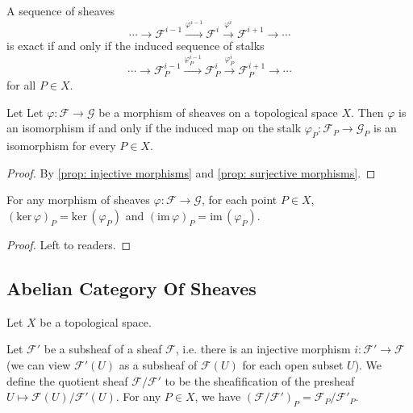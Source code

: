 \documentclass[11pt]{article}
\begin{document}
\begin{corollary}
    \cite[Exercise II.1.2]{hartsAG} 
    A sequence of sheaves 
    $$ \cdots \to \mathscr{F}^{i-1} \xrightarrow{\varphi^{i-1}} \mathscr{F}^{i} \xrightarrow{\varphi^{i}}\mathscr{F}^{i+1} \to \cdots $$ 
    is exact if and only if the induced sequence of stalks 
    $$ \cdots \to \mathscr{F}^{i-1}_{P} \xrightarrow{\varphi^{i-1}_{P}} \mathscr{F}^{i}_{P} \xrightarrow{\varphi^{i}_{P}}\mathscr{F}^{i+1}_{P} \to \cdots $$ 
    for all $ P \in X $.  
\end{corollary}

\begin{proposition}
    \label{prop: isomorphism of sheaves}
    \cite[Proposition II.1.1]{hartsAG} 
    Let Let $\varphi: \mathscr{F} \to \mathscr{G}$ be a morphism of sheaves on a topological space $X$. 
    Then $\varphi$ is an isomorphism if and only if the 
    induced map on the stalk $\varphi_{P}: \mathscr{F}_{P} \to \mathscr{G}_{P}$ is 
    an isomorphism for every $P \in X$. 
\end{proposition}

\begin{proof}
    By \autoref{prop: injective morphisms} and \autoref{prop: surjective morphisms}. 
\end{proof}

\begin{proposition}
    \cite[Exercise II.1.2]{hartsAG} 
    For any morphism of sheaves $\varphi:\mathscr{F} \to \mathscr{G}$, 
    for each point $P \in X$, $(\mathrm{ker}\,\varphi)_{P}=\mathrm{ker}\,(\varphi_{P})$ 
    and $(\mathrm{im}\,\varphi)_{P}=\mathrm{im}\,(\varphi_{P})$. 
\end{proposition}

\begin{proof}
    Left to readers. 
\end{proof}


\subsection{Abelian Category Of Sheaves}

Let $ X $ be a topological space. 

\begin{definition}
  Let $\mathscr{F}'$ be a subsheaf of a sheaf $\mathscr{F}$, 
  i.e. there is an injective morphism $ i:\mathscr{F}' \to \mathscr{F} $ 
  (we can view $ \mathscr{F}'(U) $ as a subsheaf of $ \mathscr{F}(U) $ for each open subset $ U $). 
  We define the quotient sheaf $\mathscr{F} / \mathscr{F}'$ to be the sheafification 
  of the presheaf $U \mapsto \mathscr{F}(U) / \mathscr{F}'(U)$. 
  For any $ P \in X $, we have $ (\mathscr{F} / \mathscr{F}')_{P} = \mathscr{F}_{P} / \mathscr{F}'_{P} $. 
\end{definition}
\end{document}
